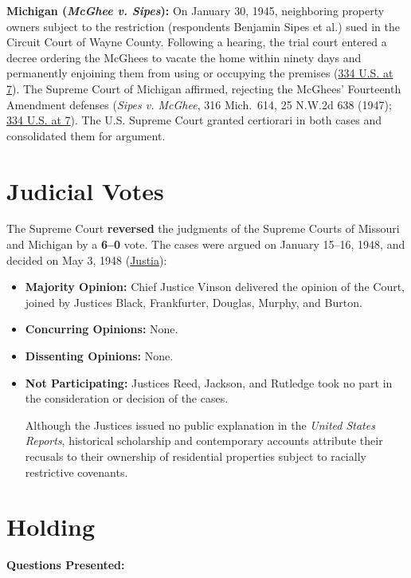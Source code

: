 \documentclass[12pt]{article}
\begin{document}
\textbf{Michigan (\textit{McGhee v. Sipes}):} On January 30, 1945, neighboring property owners subject to the restriction (respondents Benjamin Sipes et al.) sued in the Circuit Court of Wayne County. Following a hearing, the trial court entered a decree ordering the McGhees to vacate the home within ninety days and permanently enjoining them from using or occupying the premises (\href{https://supreme.justia.com/cases/federal/us/334/1/}{334 U.S. at 7}). The Supreme Court of Michigan affirmed, rejecting the McGhees' Fourteenth Amendment defenses (\textit{Sipes v. McGhee}, 316 Mich.~614, 25 N.W.2d 638 (1947); \href{https://supreme.justia.com/cases/federal/us/334/1/}{334 U.S. at 7}). The U.S. Supreme Court granted certiorari in both cases and consolidated them for argument.

\section{Judicial Votes}
The Supreme Court \textbf{reversed} the judgments of the Supreme Courts of Missouri and Michigan by a \textbf{6--0} vote. The cases were argued on January 15--16, 1948, and decided on May 3, 1948 (\href{https://supreme.justia.com/cases/federal/us/334/1/}{Justia}):

\begin{itemize}
    \item \textbf{Majority Opinion:} Chief Justice Vinson delivered the opinion of the Court, joined by Justices Black, Frankfurter, Douglas, Murphy, and Burton.
    \item \textbf{Concurring Opinions:} None.
    \item \textbf{Dissenting Opinions:} None.
    \item \textbf{Not Participating:} Justices Reed, Jackson, and Rutledge took no part in the consideration or decision of the cases.

Although the Justices issued no public explanation in the \textit{United States Reports}, historical scholarship and contemporary accounts attribute their recusals to their ownership of residential properties subject to racially restrictive covenants.

\end{itemize}

\section{Holding}
\textbf{Questions Presented:}
\end{document}
